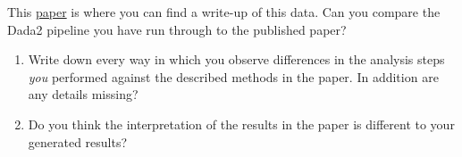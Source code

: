 \documentclass[
]{book}
\begin{document}
This \href{https://www.frontiersin.org/articles/10.3389/fmicb.2015.01470/full}{paper} is where you can find a write-up of this data. Can you compare the Dada2 pipeline you have run through to the published paper?

\begin{enumerate}
\def\labelenumi{\arabic{enumi}.}
\item
  Write down every way in which you observe differences in the analysis steps \emph{you} performed against the described methods in the paper. In addition are any details missing?
\item
  Do you think the interpretation of the results in the paper is different to your generated results?
\end{enumerate}

  
\end{document}
